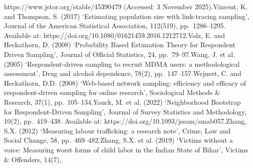 \documentclass[
  12pt,
  letterpaper,
  DIV=11,
  numbers=noendperiod]{scrartcl}
\begin{document}
{{https://www.jstor.org/stable/45390479 (Accessed: 3 November 2025).Vincent, K. and Thompson, S. (2017) `Estimating population size with link-tracing sampling', Journal of the American Statistical Association, 112(519), pp.~1286--1295. Available at: https://doi.org/10.1080/01621459.2016.1212712.Volz, E. and Heckathorn, D. (2008) `Probability Based Estimation Theory for Respondent Driven Sampling', Journal of Official Statistics, 24, pp.~79--97.Wang, J. et al. (2005) `Respondent-driven sampling to recruit MDMA users: a methodological assessment', Drug and alcohol dependence, 78(2), pp.~147--157.Wejnert, C. and Heckathorn, D.D. (2008) `Web-based network sampling: efficiency and efficacy of respondent-driven sampling for online research', Sociological Methods \& Research, 37(1), pp.~105--134.Yauck, M. et al. (2022) `Neighborhood Bootstrap for Respondent-Driven Sampling', Journal of Survey Statistics and Methodology, 10(2), pp.~419--438. Available at: https://doi.org/10.1093/jssam/smab057.Zhang, S.X. (2012) `Measuring labour trafficking: a research note', Crime, Law and Social Change, 58, pp.~469--482.Zhang, S.X. et al. (2019) `Victims without a voice: Measuring worst forms of child labor in the Indian State of Bihar', Victims \& Offenders, 14(7), }}
\end{document}
